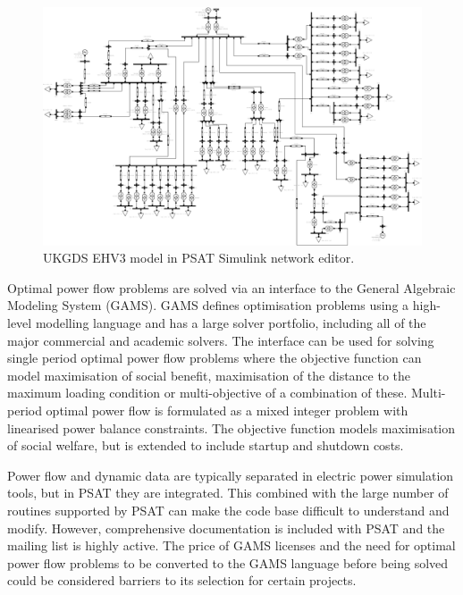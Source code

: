 \begin{figure}
  \centering
  \includegraphics[width=20cm,angle=90]{figures/psat}
  \caption{UKGDS EHV3 model in PSAT Simulink network editor.}
  \label{fig:ukgds_ehv3}
\end{figure}

Optimal power flow problems are solved via an interface to the General
Algebraic Modeling System (GAMS).  GAMS defines optimisation
problems using a high-level modelling language and has a large solver portfolio, including all
of the major commercial and academic solvers.  The interface can be used for
solving single period optimal power flow problems where the objective function
can model maximisation of social benefit, maximisation of the distance to
the maximum loading condition or multi-objective of a combination of these.
Multi-period optimal power flow is formulated as a mixed integer problem with
linearised power balance constraints.  The objective function models
maximisation of social welfare, but is extended to include startup and
shutdown costs.

Power flow and dynamic data are typically separated in electric power
simulation tools, but in PSAT they are integrated.  This combined with the
large number of routines supported by PSAT can make the code base difficult to
understand and modify.  However, comprehensive documentation is included with
PSAT and the mailing list is highly active.
The price of GAMS
licenses and the need for optimal power flow problems to be converted to the
GAMS language before being solved could be considered barriers to its
selection for certain projects.

